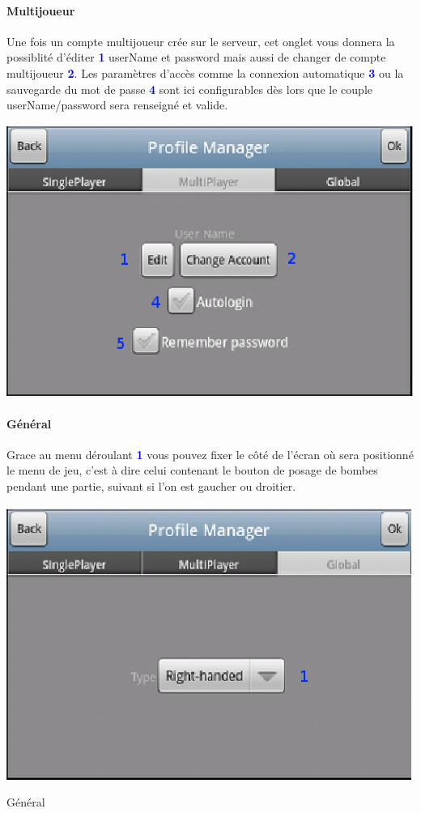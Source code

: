 		\paragraph{Multijoueur\\}
		Une fois un compte multijoueur crée sur le serveur, cet onglet vous donnera la
		possiblité d'éditer \textcolor{blue}{\textbf{1}} userName et password mais
		aussi de changer de compte multijoueur \textcolor{blue}{\textbf{2}}. Les
		paramètres d'accès comme la connexion automatique
		\textcolor{blue}{\textbf{3}} ou la sauvegarde du mot de passe
		\textcolor{blue}{\textbf{4}} sont ici configurables dès lors que le couple
		userName/password sera renseigné et valide.
		
		\begin{center}
				\includegraphics[scale=0.7]{Manuel/Img/6.eps}
		\end{center}
		
		
		\paragraph{Général\\}
		Grace au menu déroulant \textcolor{blue}{\textbf{1}} vous pouvez fixer le
		côté de l'écran où sera positionné le menu de jeu, c'est à dire celui contenant le bouton de posage de bombes pendant une
		partie, suivant si l'on est gaucher ou droitier. 
		
		\begin{center}
				\includegraphics[scale=0.7]{Manuel/Img/7.eps}
				\caption{Général}
		\end{center}
			
